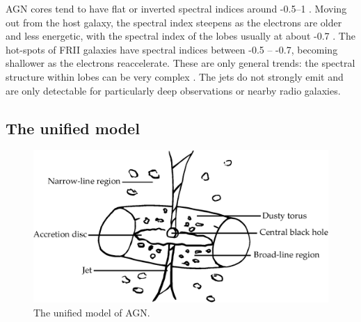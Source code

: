         AGN cores tend to have flat or inverted spectral indices around -0.5--1 \citep{condon_essential_2016,randall_spectral_2012}. Moving out from the host galaxy, the spectral index steepens as the electrons are older and less energetic, with the spectral index of the lobes usually at about -0.7 \citep{condon_essential_2016}. The hot-spots of FRII galaxies have spectral indices between -0.5 -- -0.7, becoming shallower as the electrons reaccelerate. These are only general trends: the spectral structure within lobes can be very complex \citep{treichel_spectral_2001}. The jets do not strongly emit and are only detectable for particularly deep observations or nearby radio galaxies.

    \subsection{The unified model}
    \label{sec:unified-model}

        \begin{figure}
            \centering
            \includegraphics[width=\textwidth]{images/agn.eps}
            \caption{\label{fig:agn} The unified model of AGN.}
        \end{figure}


